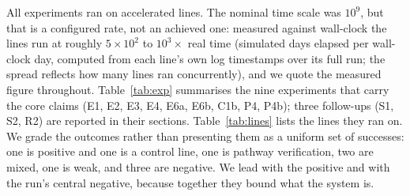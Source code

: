 \documentclass[11pt]{article}
\begin{document}
All experiments ran on accelerated lines. The nominal time scale was $10^9$, but that is a configured rate, not an achieved one: measured against wall-clock the lines run at roughly $5\times10^{2}$ to $10^{3}\times$ real time (simulated days elapsed per wall-clock day, computed from each line's own log timestamps over its full run; the spread reflects how many lines ran concurrently), and we quote the measured figure throughout. Table~\ref{tab:exp} summarises the nine experiments that carry the core claims (E1, E2, E3, E4, E6a, E6b, C1b, P4, P4b); three follow-ups (S1, S2, R2) are reported in their sections. Table~\ref{tab:lines} lists the lines they ran on. We grade the outcomes rather than presenting them as a uniform set of successes: one is positive and one is a control line, one is pathway verification, two are mixed, one is weak, and three are negative. We lead with the positive and with the run's central negative, because together they bound what the system is.
\end{document}
